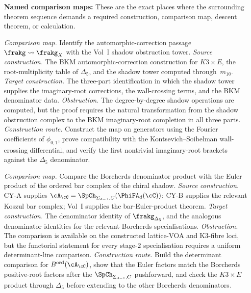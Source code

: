 \noindent\textbf{Named comparison maps:}
These are the exact places where the surrounding theorem sequence
demands a required construction, comparison map, descent theorem, or
calculation.
\begin{description}[leftmargin=2.7em,style=nextline,topsep=0.3ex,itemsep=0.6ex]
 \item[\textbf{CM--AC. Automorphic correction to shadow tower.}]
 \emph{Comparison map.}
 Identify the automorphic-correction passage
 $\frakg \leadsto \frakg_X$ with the Vol~I shadow obstruction
 tower.
 \emph{Source construction.}
 The BKM automorphic-correction construction for
 $K3 \times E$, the root-multiplicity table of
 $\Delta_5$, and the shadow tower computed through~$m_{10}$.
 \emph{Target construction.}
 The three-part identification in which the shadow tower
 supplies the imaginary-root corrections, the wall-crossing
 terms, and the BKM denominator data.
 \emph{Obstruction.}
 The degree-by-degree shadow operations are computed, but the
 proof requires the natural transformation from the shadow
 obstruction complex to the BKM imaginary-root completion in
 all three parts.
 \emph{Construction route.}
 Construct the map on generators using the Fourier
 coefficients of $\phi_{0,1}$, prove compatibility with the
 Kontsevich--Soibelman wall-crossing differential, and verify
 the first nontrivial imaginary-root brackets against the
 $\Delta_5$ denominator.
 \item[\textbf{CM--BE. Denominator identity to bar Euler product.}]
 \emph{Comparison map.}
 Compare the Borcherds denominator product with the Euler
 product of the ordered bar complex of the chiral shadow.
 \emph{Source construction.}
 CY-A supplies
 $\cA_\cC=\SpCh_{\Sigma_{d-1}, C}(\PhiFA_d(\cC))$; CY-B
 supplies the relevant Koszul bar complex; Vol~I supplies the
 bar-Euler-product theorem.
 \emph{Target construction.}
 The denominator identity of $\frakg_{\Delta_5}$, and the
 analogous denominator identities for the relevant Borcherds
 specialisations.
 \emph{Obstruction.}
 The comparison is available on the constructed lattice-VOA
 and K3-fibre loci, but the functorial statement for every
 stage-$2$ specialisation requires a uniform
 determinant-line comparison.
 \emph{Construction route.}
 Build the determinant comparison for
 $B^{\mathrm{ord}}(\cA_\cC)$, show that the Euler factors
 match the Borcherds positive-root factors after the
 $\SpCh_{\Sigma_{d-1},C}$ pushforward, and check the
 $K3\times E$ product through $\Delta_5$ before extending to
 the other Borcherds denominators.
 \item[\textbf{CM--HCS. Six-dimensional hCS to Hall positive half.}]

\end{description}

